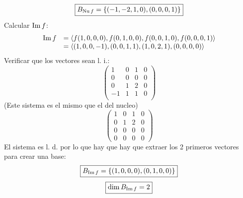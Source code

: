 \documentclass[../practica.root.tex]{subfiles}
\begin{document}
\begin{enumerate}
\begin{enumerate}
\[                    \] \[
                        \boxed{B_{\operatorname{Nu} f} = \{ (-1,-2,1,0),(0,0,0,1) \}}
                    \]
                    Calcular \( \operatorname{Im} f \):
                    \[
                        \begin{array}{rl}
                            \operatorname{Im} f & = \langle f(1,0,0,0),f(0,1,0,0),f(0,0,1,0),f(0,0,0,1) \rangle \\
                                   & = \langle (1,0,0,-1),(0,0,1,1),(1,0,2,1),(0,0,0,0) \rangle
                        \end{array}
                    \]
                    Verificar que los vectores sean l. i.:
                    \[
                        \begin{pmatrix}
                            1  & 0 & 1 & 0 \\
                            0  & 0 & 0 & 0 \\
                            0  & 1 & 2 & 0 \\
                            -1 & 1 & 1 & 0 \\
                        \end{pmatrix}
                    \]
                    (Este sistema es el mismo que el del nucleo)
                    \[
                        \begin{pmatrix}
                            1 & 0 & 1 & 0 \\
                            0 & 1 & 2 & 0 \\
                            0 & 0 & 0 & 0 \\
                            0 & 0 & 0 & 0
                        \end{pmatrix}
                    \]
                    El sistema es l. d. por lo que hay que hay que extraer los 2 primeros vectores para crear una base:
                    \[ \boxed{B_{\operatorname{Im} f} = \{ (1,0,0,0),(0,1,0,0) \}} \]
                    \[ \boxed{\dim B_{\operatorname{Im} f} = 2} \]


\end{enumerate}
\end{enumerate}
\end{document}
